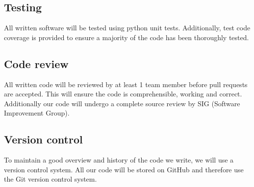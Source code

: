 \documentclass{article}
\begin{document}
\subsection{Testing}
All written software will be tested using python unit tests. Additionally, test code coverage is provided to ensure a majority of the code has been thoroughly tested.

\subsection{Code review}
All written code will be reviewed by at least 1 team member before pull requests are accepted. This will ensure the code is comprehensible, working and correct. Additionally our code will undergo a complete source review by SIG (Software Improvement Group).

\subsection{Version control}
To maintain a good overview and history of the code we write, we will use a version control system. All our code will be stored on GitHub and therefore use the Git version control system.
\end{document}
